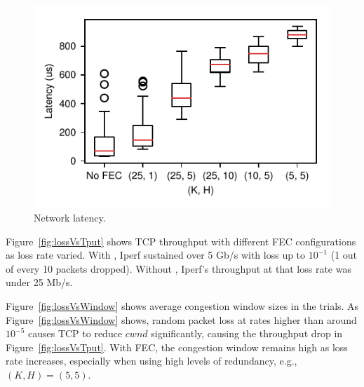 \begin{figure}[!ht]
\begin{minipage}[b]{0.32\linewidth}
\includegraphics[width=\textwidth]{figures/latency.pdf}
\caption{Network latency.}
\label{fig:latency}
\end{minipage}
\end{figure}




Figure~\ref{fig:lossVsTput} shows TCP throughput with different FEC
configurations as loss rate varied. With \OurSys, Iperf sustained  over 5 Gb/s
with loss up to $10^{-1}$ (1 out of every 10 packets dropped). Without
\OurSys, Iperf's throughput at that loss rate was under 25 Mb/s. 

Figure~\ref{fig:lossVsWindow} shows average congestion window sizes in 
the trials.
As Figure~\ref{fig:lossVsWindow} shows, random packet loss 
at rates higher than around $10^{-5}$ causes TCP to reduce $cwnd$ significantly, 
causing the throughput drop in Figure~\ref{fig:lossVsTput}. With FEC, 
the congestion window remains high as loss rate increases, especially when 
using high levels of redundancy, e.g., $(K, H) = (5, 5)$. 

